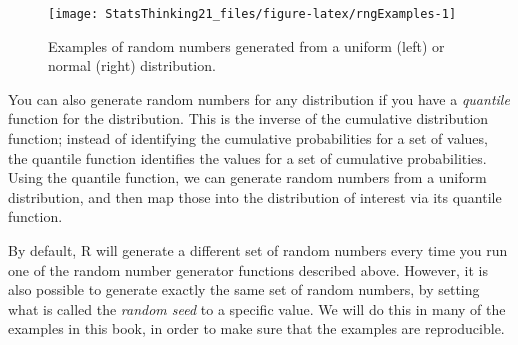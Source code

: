 \documentclass[]{book}
\newenvironment{Shaded}{\begin{snugshade}}{\end{snugshade}}
\newcommand{\KeywordTok}[1]{\textcolor[rgb]{0.13,0.29,0.53}{\textbf{#1}}}
\newcommand{\DataTypeTok}[1]{\textcolor[rgb]{0.13,0.29,0.53}{#1}}
\newcommand{\DecValTok}[1]{\textcolor[rgb]{0.00,0.00,0.81}{#1}}
\newcommand{\StringTok}[1]{\textcolor[rgb]{0.31,0.60,0.02}{#1}}
\newcommand{\OperatorTok}[1]{\textcolor[rgb]{0.81,0.36,0.00}{\textbf{#1}}}
\newcommand{\NormalTok}[1]{#1}
\theoremstyle{definition}
\theoremstyle{definition}
\theoremstyle{definition}
\theoremstyle{remark}
\begin{document}
\begin{Shaded}
\end{Shaded}

\begin{figure}
\texttt{[image: StatsThinking21\_files/figure-latex/rngExamples-1]} \caption{Examples of random numbers generated from a uniform (left) or normal (right) distribution.}\label{fig:rngExamples}
\end{figure}

You can also generate random numbers for any distribution if you have a
\emph{quantile} function for the distribution. This is the inverse of
the cumulative distribution function; instead of identifying the
cumulative probabilities for a set of values, the quantile function
identifies the values for a set of cumulative probabilities. Using the
quantile function, we can generate random numbers from a uniform
distribution, and then map those into the distribution of interest via
its quantile function.

By default, R will generate a different set of random numbers every time
you run one of the random number generator functions described above.
However, it is also possible to generate exactly the same set of random
numbers, by setting what is called the \emph{random seed} to a specific
value. We will do this in many of the examples in this book, in order to
make sure that the examples are reproducible.
\end{document}
